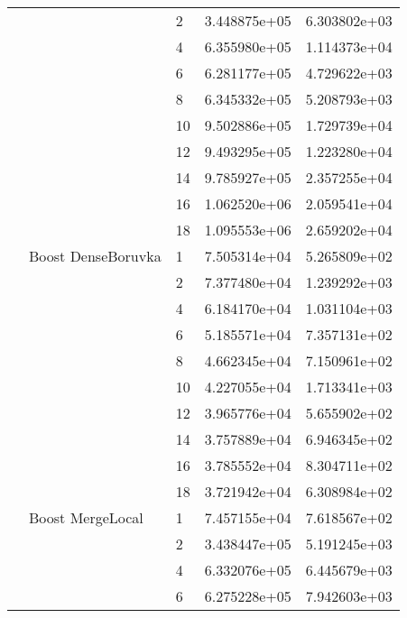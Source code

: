 \begin{tabular}{lllrr}
                      &            & 2  &  3.448875e+05 &  6.303802e+03 \\
                      &            & 4  &  6.355980e+05 &  1.114373e+04 \\
                      &            & 6  &  6.281177e+05 &  4.729622e+03 \\
                      &            & 8  &  6.345332e+05 &  5.208793e+03 \\
                      &            & 10 &  9.502886e+05 &  1.729739e+04 \\
                      &            & 12 &  9.493295e+05 &  1.223280e+04 \\
                      &            & 14 &  9.785927e+05 &  2.357255e+04 \\
                      &            & 16 &  1.062520e+06 &  2.059541e+04 \\
                      &            & 18 &  1.095553e+06 &  2.659202e+04 \\
                      & Boost DenseBoruvka & 1  &  7.505314e+04 &  5.265809e+02 \\
                      &            & 2  &  7.377480e+04 &  1.239292e+03 \\
                      &            & 4  &  6.184170e+04 &  1.031104e+03 \\
                      &            & 6  &  5.185571e+04 &  7.357131e+02 \\
                      &            & 8  &  4.662345e+04 &  7.150961e+02 \\
                      &            & 10 &  4.227055e+04 &  1.713341e+03 \\
                      &            & 12 &  3.965776e+04 &  5.655902e+02 \\
                      &            & 14 &  3.757889e+04 &  6.946345e+02 \\
                      &            & 16 &  3.785552e+04 &  8.304711e+02 \\
                      &            & 18 &  3.721942e+04 &  6.308984e+02 \\
                      & Boost MergeLocal & 1  &  7.457155e+04 &  7.618567e+02 \\
                      &            & 2  &  3.438447e+05 &  5.191245e+03 \\
                      &            & 4  &  6.332076e+05 &  6.445679e+03 \\
                      &            & 6  &  6.275228e+05 &  7.942603e+03 \\

\end{tabular}
